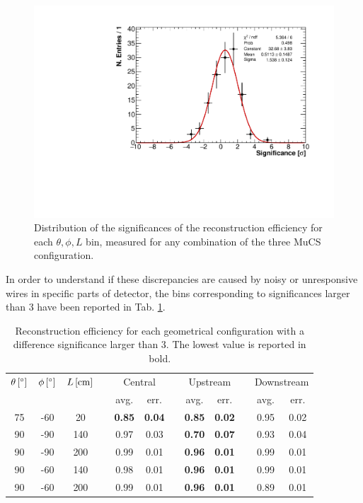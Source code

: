 \documentclass[a4paper]{scrartcl}
\begin{document}
\begin{figure}[htbp]
  \begin{center}
    \includegraphics[width=0.7\linewidth]{figures/significance.pdf}
    \caption{Distribution of the significances of the reconstruction efficiency for each $\theta,\phi,L$ bin, measured for any combination of the three MuCS configuration.} \label{fig:significance}
  \end{center}
\end{figure}

In order to understand if these discrepancies are caused by noisy or unresponsive wires in specific parts of detector, the bins corresponding to significances larger than 3 have been reported in Tab. \ref{tab:significance}.

\begin{table}[htbp]
  \centering
  \begin{tabular}{cccccccccccc}
    \toprule
    $\theta\thinspace[^\circ]$ & $\phi\thinspace[^\circ]$ & $L\thinspace[\mathrm{cm}]$ & \phantom{a} & \multicolumn{2}{c}{Central} & \phantom{a} & \multicolumn{2}{c}{Upstream} & \phantom{a} & \multicolumn{2}{c}{Downstream}\\
     \cmidrule{5-6} \cmidrule{8-9} \cmidrule{11-12}
      &  &  & & avg. & err. & & avg. & err. & & avg. & err.   \\
    \midrule
    75 & -60 & 20 & & \textbf{0.85} & \textbf{0.04} & & \textbf{0.85} & \textbf{0.02} & & 0.95 & 0.02\\
    90 & -90 & 140 & & 0.97 & 0.03 & & \textbf{0.70} & \textbf{0.07} & & 0.93 & 0.04\\
    90 & -90 & 200 & & 0.99 & 0.01 & & \textbf{0.96} & \textbf{0.01} & & 0.99 & 0.01\\
    90 & -60 & 140 & & 0.98 & 0.01 & & \textbf{0.96} & \textbf{0.01} & & 0.99 & 0.01\\
    90 & -60 & 200 & & 0.99 & 0.01 & & \textbf{0.96} & \textbf{0.01} & & 0.89 & 0.01\\

    \bottomrule
  \end{tabular}
  \caption{Reconstruction efficiency for each geometrical configuration with a difference significance larger than 3. The lowest value is reported in bold.}\label{tab:significance}
\end{table}
\end{document}
